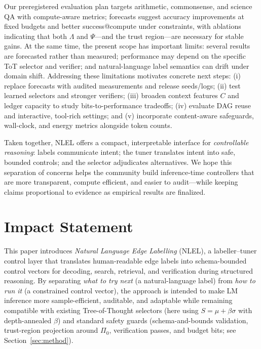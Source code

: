 \documentclass{article}
\theoremstyle{plain}
\theoremstyle{definition}
\theoremstyle{remark}
\begin{document}
Our preregistered evaluation plan targets arithmetic, commonsense, and science QA with compute-aware metrics; forecasts suggest accuracy improvements at fixed budgets and better success@compute under constraints, with ablations indicating that both \(\Lambda\) and \(\Psi\)---and the trust region---are necessary for stable gains. At the same time, the present scope has important limits: several results are forecasted rather than measured; performance may depend on the specific ToT selector and verifier; and natural-language label semantics can drift under domain shift. Addressing these limitations motivates concrete next steps: (i) replace forecasts with audited measurements and release seeds/logs; (ii) test learned selectors and stronger verifiers; (iii) broaden context features \(C\) and ledger capacity to study bits-to-performance tradeoffs; (iv) evaluate DAG reuse and interactive, tool-rich settings; and (v) incorporate content-aware safeguards, wall-clock, and energy metrics alongside token counts.

Taken together, NLEL offers a compact, interpretable interface for \emph{controllable reasoning}: labels communicate intent; the tuner translates intent into safe, bounded controls; and the selector adjudicates alternatives. We hope this separation of concerns helps the community build inference-time controllers that are more transparent, compute efficient, and easier to audit---while keeping claims proportional to evidence as empirical results are finalized.

\section*{Impact Statement}

This paper introduces \emph{Natural Language Edge Labelling} (NLEL), a
labeller--tuner control layer that translates human-readable edge labels
into schema-bounded control vectors for decoding, search, retrieval, and
verification during structured reasoning. By separating \emph{what to try next}
(a natural-language label) from \emph{how to run it} (a constrained control vector),
the approach is intended to make LM inference more sample-efficient,
auditable, and adaptable while remaining compatible with existing
Tree-of-Thought selectors (here using $S=\mu+\beta\sigma$ with depth-annealed
$\beta$) and standard safety guards (schema-and-bounds validation,
trust-region projection around $\Pi_0$, verification passes, and budget bits;
see Section~\ref{sec:method}).
\end{document}
